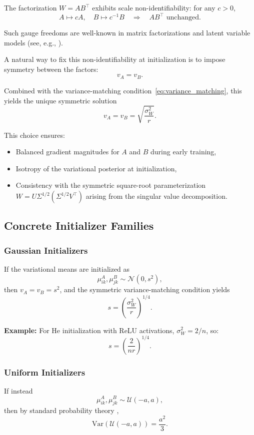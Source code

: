 \documentclass{article}
\theoremstyle{plain}
\theoremstyle{definition}
\theoremstyle{remark}
\begin{document}
The factorization $W = AB^\top$ exhibits scale non-identifiability: for any $c>0$,
\[
A \mapsto cA,
\quad
B \mapsto c^{-1}B
\quad
\Rightarrow
\quad
AB^\top \text{ unchanged}.
\]

Such gauge freedoms are well-known in matrix factorizations and latent variable models (see, e.g., \cite{udell2015generalizedlowrankmodels}).

A natural way to fix this non-identifiability at initialization is to impose symmetry between the factors:
\[
v_A = v_B.
\]

Combined with the variance-matching condition~\eqref{eq:variance_matching}, this yields the unique symmetric solution
\[
v_A = v_B = \sqrt{\frac{\sigma_W^2}{r}}.
\]

This choice ensures:
\begin{itemize}
    \item Balanced gradient magnitudes for $A$ and $B$ during early training,
    \item Isotropy of the variational posterior at initialization,
    \item Consistency with the symmetric square-root parameterization $W = U \Sigma^{1/2} (\Sigma^{1/2} V^\top)$ arising from the singular value decomposition.
\end{itemize}

\subsection{Concrete Initializer Families}\label{app:init:concrete}

\subsubsection{Gaussian Initializers}

If the variational means are initialized as
\[
\mu^A_{ik}, \mu^B_{jk} \sim \mathcal{N}(0, s^2),
\]
then $v_A = v_B = s^2$, and the symmetric variance-matching condition yields
\[
s = \left(\frac{\sigma_W^2}{r}\right)^{1/4}.
\]

\textbf{Example:} For He initialization with ReLU activations, $\sigma_W^2 = 2/n$, so:
\[
s = \left(\frac{2}{nr}\right)^{1/4}.
\]

\subsubsection{Uniform Initializers}

If instead
\[
\mu^A_{ik}, \mu^B_{jk} \sim \mathcal{U}(-a,a),
\]
then by standard probability theory \cite{casella2002statistical},
\[
\mathrm{Var}(\mathcal{U}(-a,a)) = \frac{a^2}{3}.
\]
\end{document}
